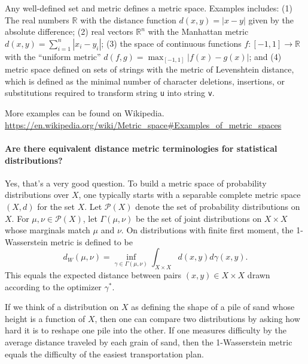 \documentclass[10pt,english]{article}
\begin{document}
Any well-defined set and metric defines a metric space. Examples includes: (1) The real numbers $\mathbb{R}$ with the distance function $d(x,y) = \vert x-y\vert$ given by the absolute difference; (2) real vectors $\mathbb{R}^n$ with the Manhattan metric $d(x,y) = \sum_{i=1}^n |x_i - y_i|$; (3) the space of continuous functions $f\colon [-1,1] \to \mathbb{R}$ with the ``uniform metric'' $d(f,g) = \max_{[-1,1]} | f(x)-g(x)|$;
%
%
and (4) metric space defined on sets of strings with the metric of Levenshtein distance, which is defined as the minimal number of character deletions, insertions, or substitutions required to transform string \texttt{u} into string \texttt{v}.

More examples can be found on Wikipedia. \url{https://en.wikipedia.org/wiki/Metric_space#Examples_of_metric_spaces}

\paragraph{Are there equivalent distance metric terminologies for statistical distributions?}

Yes, that's a very good question.
To build a metric space of probability distributions over $X$, one typically starts with a separable complete metric space $(X,d)$ for the set $X$.
Let $\mathcal{P}(X)$ denote the set of probability distributions on $X$.
For $\mu,\nu \in \mathcal{P}(X)$, let $\Gamma(\mu,\nu)$ be the set of joint distributions on $X \times X$ whose marginals match $\mu$ and $\nu$.
On distributions with finite first moment, the 1-Wasserstein metric is defined to be
\[ d_W (\mu, \nu) = \inf_{\gamma \in \Gamma(\mu,\nu)} \int_{X\times X} d(x,y) d\gamma(x,y).  \]
This equals the expected distance between pairs $(x,y) \in X \times X$ drawn according to the optimizer $\gamma^*$.

If we think of a distribution on $X$ as defining the shape of a pile of sand whose height is a function of $X$, then one can compare two distributions by asking how hard it is to reshape one pile into the other.
If one measures difficulty by the average distance traveled by each grain of sand, then the 1-Wasserstein metric equals the difficulty of the easiest transportation plan.
\end{document}
